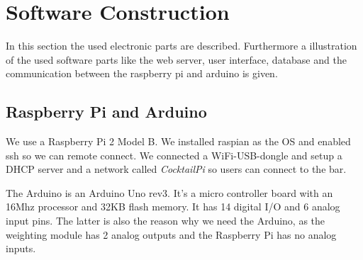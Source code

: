 \documentclass{acm_proc_article-sp}
\begin{document}
\begin{minipage}{\linewidth}%
\label{fig:soldering}%
\end{minipage}



\section{Software Construction}
In this section the used electronic parts are described. Furthermore a illustration of the used software parts like the web server, user interface, database and the communication between the raspberry pi and arduino is given.

\subsection{Raspberry Pi and Arduino}
We use a Raspberry Pi 2 Model B. We installed raspian as the OS and enabled ssh so we can remote connect. We connected a WiFi-USB-dongle and setup a DHCP server and a network called \textit{CocktailPi} so users can connect to the bar.

The Arduino is an Arduino Uno rev3. It's a micro controller board with an 16Mhz processor and 32KB flash memory. It has 14 digital I/O and 6 analog input pins. The latter is also the reason why we need the Arduino, as the weighting module has 2 analog outputs and the Raspberry Pi has no analog inputs.
\end{document}
